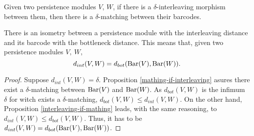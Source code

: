 \begin{proposition}\label{mathing-if-interleaving}
    Given two persistence modules $ V $, $ W $, if there is a $\delta$-interleaving morphism between them, then there is a $ \delta$-matching between their barcodes.
\end{proposition}

\begin{theorem}[Stability]
    There is an isometry between a persistence module with the interleaving distance and its barcode with the bottleneck distance. This means that, given two persistence modules $ V, \ W $, 
    $$ 
        d_{int} (V, W) = d_{bot} (\operatorname{Bar}(V), \operatorname{Bar}(W)).
    $$
\end{theorem}
\begin{proof}
    Suppose $ d_{int}(V, W) = \delta $. Proposition \ref{mathing-if-interleaving} asures there exist a $\delta$-matching between $ \operatorname{Bar}(V) $ and $ \operatorname{Bar} (W) $. As $ d_{bot}(V, W) $ is the infimum $\delta$ for witch exists a $\delta$-matching, $ d_{bot}(V, W) \leq d_{int}(V, W)$. On the other hand, Proposition \ref{interleaving-if-mathing} leads, with the same reasoning, to $ d_{int}(V, W) \leq d_{bot}(V, W)$. Thus, it has to be $ d_{int} (V, W) = d_{bot} (\operatorname{Bar}(V), \operatorname{Bar}(W)) $.
\end{proof}
